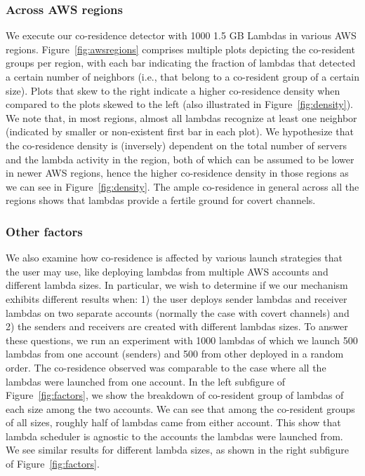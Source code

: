 \subsubsection{Across AWS regions}
We execute our co-residence detector with 1000 1.5 GB Lambdas in various AWS
regions. Figure~\ref{fig:awsregions} comprises multiple plots depicting
the co-resident groups per region, with each bar indicating the fraction of
lambdas that detected a certain number of neighbors (i.e., that belong to a
co-resident group of a certain size). Plots that skew to the right indicate a
higher co-residence density when compared to the plots skewed to the left (also
illustrated in Figure~\ref{fig:density}). We note that, in most regions, almost
all lambdas recognize at least one neighbor (indicated by smaller or
non-existent first bar in each plot). We hypothesize that the co-residence
density is (inversely) dependent on the total number of servers and the lambda
activity in the region, both of which can be assumed to be lower in newer AWS
regions, hence the higher co-residence density in those regions as we can see in
Figure~\ref{fig:density}. The ample co-residence in general across all the
regions shows that lambdas provide a fertile ground for covert channels.


\subsubsection{Other factors}
We also examine how co-residence is affected by various launch strategies that
the user may use, like deploying lambdas from multiple AWS accounts and
different lambda sizes. In particular, we wish to determine if we our mechanism
exhibits different results when: 1) the user deploys sender lambdas and receiver
lambdas on two separate accounts (normally the case with covert channels) and 2)
the senders and receivers are created with different lambdas sizes.  To answer
these questions, we run an experiment with 1000 lambdas of which we launch 500
lambdas from one account (senders) and 500 from other deployed in a random
order. The co-residence observed was comparable to the case where all the
lambdas were launched from one account. In the left subfigure of
Figure~\ref{fig:factors}, we show the breakdown of co-resident group of lambdas
of each size among the two accounts.  We can see that among the co-resident
groups of all sizes, roughly half of lambdas came from either account. This show
that lambda scheduler is agnostic to the accounts the lambdas were launched
from. We see similar results for different lambda sizes, as shown in the right
subfigure of Figure~\ref{fig:factors}.

